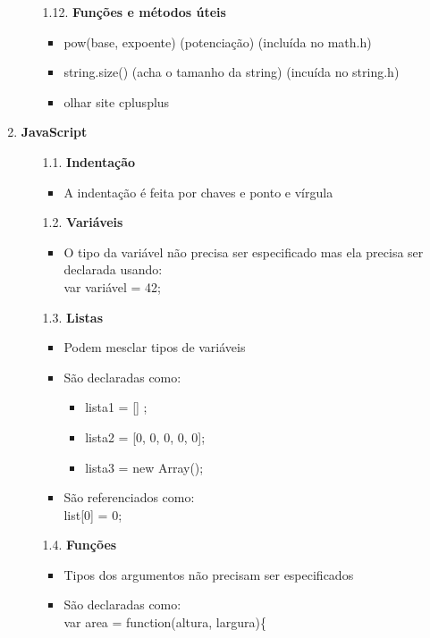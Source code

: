 \documentclass[12pt, a4paper]{article} %
\begin{document}
\begin{enumerate}
\begin{enumerate}
\item[1.12.] \textbf{Funções e métodos úteis}
\begin{itemize}
\item pow(base, expoente) (potenciação) (incluída no math.h)
\item string.size() (acha o tamanho da string) (incuída no string.h)
\item olhar site cplusplus
\end{itemize}
\end{enumerate}
\Large
\item \textbf{JavaScript}
\normalsize
\begin{enumerate}
\item[1.1.] \textbf{Indentação} 
\begin{itemize}
\item A indentação é feita por chaves e ponto e vírgula
\end{itemize}
\item[1.2.] \textbf{Variáveis} 
\begin{itemize}
\item O tipo da variável não precisa ser especificado mas ela precisa ser declarada usando:\\
var variável = 42;
\end{itemize}
\item[1.3.] \textbf{Listas}
\begin{itemize}
\item Podem mesclar tipos de variáveis
\item São declaradas como: 
\begin{itemize}
\item lista1 = [] ;
\item lista2 = [0, 0, 0, 0, 0];
\item lista3 = new Array();
\end{itemize}
\item São referenciados como: \\
list[0] = 0;
\end{itemize}
\item[1.4.] \textbf{Funções}
\begin{itemize}
\item Tipos dos argumentos não precisam ser especificados
\item São declaradas como: \\
var area = function(altura, largura)\{ \\[-0.5cm]


\end{itemize}
\end{enumerate}
\end{enumerate}
\end{document}
